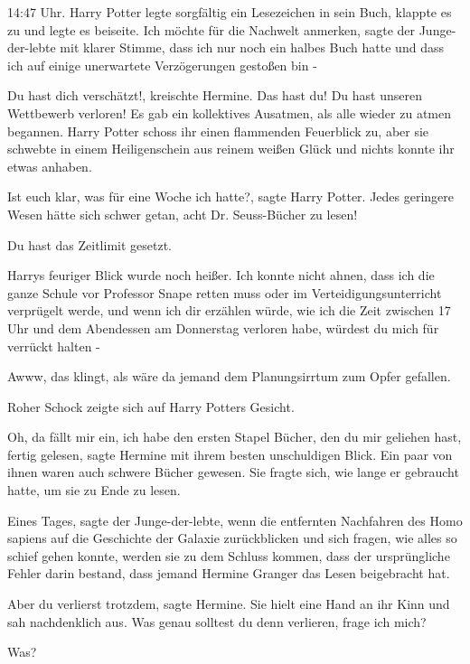 14:47 Uhr. Harry Potter legte sorgfältig ein Lesezeichen in sein Buch, klappte
es zu und legte es beiseite. \glqq Ich möchte für die Nachwelt anmerken\grqq{},
sagte der Junge-der-lebte mit klarer Stimme, \glqq dass ich nur noch ein halbes
Buch hatte und dass ich auf einige unerwartete Verzögerungen gestoßen bin
-\grqq{}

\glqq Du hast dich verschätzt!\grqq{}, kreischte Hermine. \glqq Das hast du! Du
hast unseren Wettbewerb verloren!\grqq{} Es gab ein kollektives Ausatmen, als
alle wieder zu atmen begannen. Harry Potter schoss ihr einen flammenden
Feuerblick zu, aber sie schwebte in einem Heiligenschein aus reinem weißen Glück
und nichts konnte ihr etwas anhaben.

\glqq Ist euch klar, was für eine Woche ich hatte?\grqq{}, sagte Harry Potter.
\glqq Jedes geringere Wesen hätte sich schwer getan, acht Dr. Seuss-Bücher zu
lesen!\grqq{}

\glqq Du hast das Zeitlimit gesetzt.\grqq{}

Harrys feuriger Blick wurde noch heißer. \glqq Ich konnte nicht ahnen, dass ich
die ganze Schule vor Professor Snape retten muss oder im Verteidigungsunterricht
verprügelt werde, und wenn ich dir erzählen würde, wie ich die Zeit zwischen 17
Uhr und dem Abendessen am Donnerstag verloren habe, würdest du mich für verrückt
halten -\grqq{}

\glqq Awww, das klingt, als wäre da jemand dem Planungsirrtum zum Opfer
gefallen.\grqq{}

Roher Schock zeigte sich auf Harry Potters Gesicht.

\glqq Oh, da fällt mir ein, ich habe den ersten Stapel Bücher, den du mir
geliehen hast, fertig gelesen\grqq{}, sagte Hermine mit ihrem besten
unschuldigen Blick. Ein paar von ihnen waren auch schwere Bücher gewesen. Sie
fragte sich, wie lange er gebraucht hatte, um sie zu Ende zu lesen.

\glqq Eines Tages\grqq{}, sagte der Junge-der-lebte, \glqq wenn die entfernten
Nachfahren des Homo sapiens auf die Geschichte der Galaxie zurückblicken und
sich fragen, wie alles so schief gehen konnte, werden sie zu dem Schluss kommen,
dass der ursprüngliche Fehler darin bestand, dass jemand Hermine Granger das
Lesen beigebracht hat.\grqq{}

\glqq Aber du verlierst trotzdem\grqq{}, sagte Hermine. Sie hielt eine Hand an
ihr Kinn und sah nachdenklich aus. \glqq Was genau solltest du denn verlieren,
frage ich mich?\grqq{}

\glqq Was?\grqq{}

